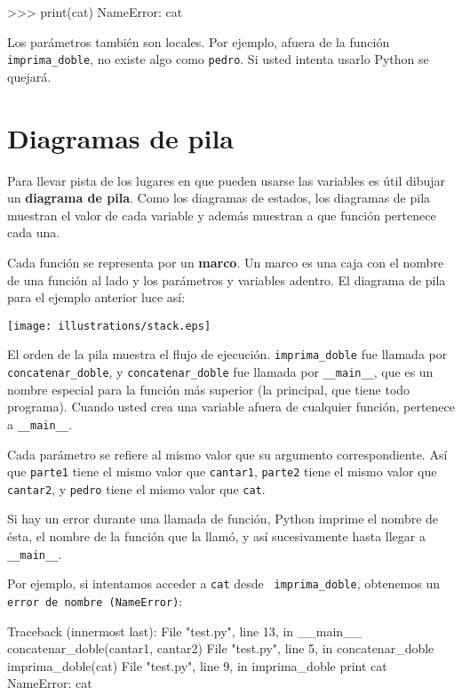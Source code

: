 \beforeverb
\begin{pyconcode}
>>> print(cat)
NameError: cat
\end{pyconcode}
\afterverb
%

Los parámetros también son locales.
Por ejemplo, afuera de la función \texttt{imprima\_doble}, no existe
algo como \texttt{pedro}. Si usted intenta usarlo Python se quejará.

\section{Diagramas de pila}
\label{stackdiagram}

Para llevar pista de los lugares en que pueden usarse las variables
es útil dibujar un {\bf diagrama de pila}. Como los diagramas de estados,
los diagramas de pila muestran el valor de cada variable y además muestran
a que función pertenece cada una.

Cada función se representa por un {\bf marco}.  Un marco es una caja
con el nombre de una función al lado y los parámetros y variables adentro.
El diagrama de pila para el ejemplo anterior luce así:

\beforefig
\centerline{\texttt{[image: illustrations/stack.eps]}}
\afterfig

El orden de la pila muestra el flujo  de ejecución.  \texttt{imprima\_doble}
fue llamada por \texttt{concatenar\_doble}, y \texttt{concatenar\_doble} fue 
llamada por {\tt\_\_main\_\_}, que es un nombre especial para la función más 
superior (la principal, que tiene todo programa). Cuando usted crea una 
variable afuera de cualquier función, pertenece a {\tt\_\_main\_\_}.

Cada parámetro se refiere al mismo valor que su argumento correspondiente. Así 
que \texttt{parte1} tiene el mismo valor que \texttt{cantar1}, \texttt{parte2} 
tiene el mismo valor que \texttt{cantar2}, y \texttt{pedro} tiene el mismo 
valor que  \texttt{cat}.

Si hay un error durante una llamada de función, Python imprime el nombre de 
ésta, el nombre de la función que la llamó, y así sucesivamente hasta llegar a 
\texttt{\_\_main\_\_}.

Por ejemplo, si intentamos acceder a  \texttt{cat} desde {\tt
imprima\_doble}, obtenemos un \texttt{error de nombre (NameError)}:

\beforeverb
\begin{pyconcode}
Traceback (innermost last):
  File "test.py", line 13, in __main__
    concatenar_doble(cantar1, cantar2)
  File "test.py", line 5, in concatenar_doble
    imprima_doble(cat)
  File "test.py", line 9, in imprima_doble
    print cat
NameError: cat
\end{pyconcode}
\afterverb
%

